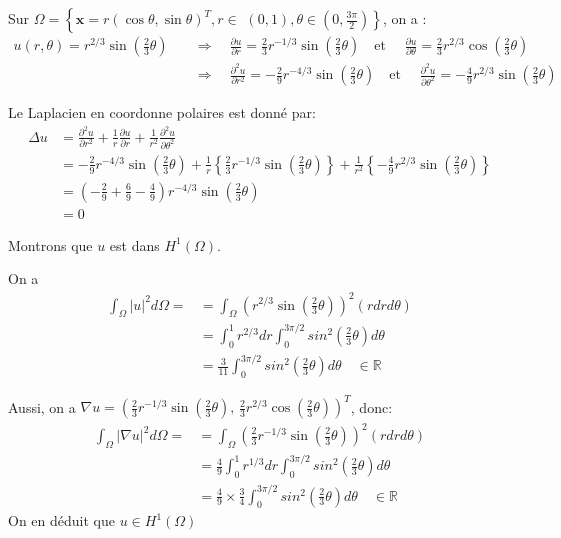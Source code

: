 \documentclass{article}
\begin{document}
Sur $\Omega=\left\{\mathbf{x}=r(\cos \theta, \sin \theta)^{T}, r \in\right.$ $\left.(0,1), \theta \in\left(0, \frac{3 \pi}{2}\right)\right\}$, on a :
\begin{align*}
	u(r,\theta) = r^{2/3}\sin(\frac{2}{3}\theta) \quad  
	&\Rightarrow \quad \frac{\partial u}{\partial r} = \frac{2}{3}r^{-1/3}\sin(\frac{2}{3}\theta) \quad \text{et } \quad \frac{\partial u}{\partial \theta} = \frac{2}{3}r^{2/3}\cos(\frac{2}{3}\theta) \\
	&\Rightarrow \quad \frac{\partial^2 u}{\partial r^2} = -\frac{2}{9}r^{-4/3}\sin(\frac{2}{3}\theta) \quad \text{et } \quad \frac{\partial^2 u}{\partial \theta^2} = -\frac{4}{9}r^{2/3}\sin(\frac{2}{3}\theta)
\end{align*}

Le Laplacien en coordonne polaires est donné par:
\begin{align*}
	\Delta u &= \frac{\partial^2 u}{\partial r^2} + \frac{1}{r}\frac{\partial u}{\partial r} + \frac{1}{r^2}\frac{\partial^2 u}{\partial \theta^2}\\
	&=-\frac{2}{9}r^{-4/3}\sin(\frac{2}{3}\theta) + \frac{1}{r}\left\{ \frac{2}{3}r^{-1/3}\sin(\frac{2}{3}\theta) \right\} + \frac{1}{r^2}\left\{ -\frac{4}{9}r^{2/3}\sin(\frac{2}{3}\theta) \right\}\\
	&=\left( -\frac{2}{9} + \frac{6}{9} -\frac{4}{9} \right)r^{-4/3}\sin(\frac{2}{3}\theta) \\
	&= 0
\end{align*}


\begin{question*}
	Montrons que $u$ est dans $H^1(\Omega)$.
\end{question*}

On a 
\begin{align*}
	\int_{\Omega} |u|^2 d\Omega = 
	&= \int_{\Omega} \left( r^{2/3}\sin(\frac{2}{3}\theta) \right)^2 (rdrd\theta) \\
	&= \int_{0}^{1}r^{2/3}dr \int_0^{3\pi/2}sin^2(\frac{2}{3}\theta)d\theta \\
	&= \frac{3}{11} \int_0^{3\pi/2}sin^2(\frac{2}{3}\theta)d\theta \quad \in \mathbb{R}
\end{align*}

Aussi, on a $ \nabla u = \left(\frac{2}{3}r^{-1/3}\sin(\frac{2}{3}\theta), \,\frac{2}{3}r^{2/3}\cos(\frac{2}{3}\theta) \right)^T $, donc:
\begin{align*}
	\int_{\Omega} |\nabla u|^2 d\Omega = 
	&= \int_{\Omega} \left( \frac{2}{3} r^{-1/3}\sin(\frac{2}{3}\theta) \right)^2 (rdrd\theta) \\
	&= \frac{4}{9} \int_{0}^{1}r^{1/3}dr \int_0^{3\pi/2}sin^2(\frac{2}{3}\theta)d\theta \\
	&= \frac{4}{9} \times \frac{3}{4} \int_0^{3\pi/2}sin^2(\frac{2}{3}\theta)d\theta \quad \in \mathbb{R}
\end{align*}
On en déduit que $ u \in H^1(\Omega)$
\end{document}
